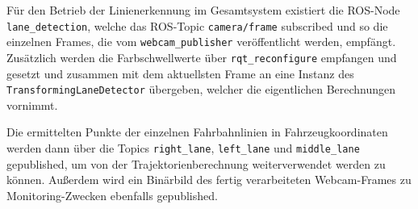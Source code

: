 F\"ur den Betrieb der Linienerkennung im Gesamtsystem existiert die ROS-Node \texttt{lane\_detection},
welche das ROS-Topic \texttt{camera/frame} subscribed und so die einzelnen Frames, die vom
\texttt{webcam\_publisher} ver\"offentlicht werden, empf\"angt. Zus\"atzlich werden die Farbschwellwerte
\"uber \texttt{rqt\_reconfigure}\cite{reconfigure} empfangen und gesetzt und zusammen mit
dem aktuellsten Frame an eine Instanz des \texttt{TransformingLaneDetector} \"ubergeben, welcher die
eigentlichen Berechnungen vornimmt.

Die ermittelten Punkte der einzelnen Fahrbahnlinien in Fahrzeugkoordinaten werden dann \"uber die Topics
\texttt{right\_lane}, \texttt{left\_lane} und \texttt{middle\_lane} gepublished, um von der
Trajektorienberechnung weiterverwendet werden zu k\"onnen. Au\ss erdem wird ein Bin\"arbild des fertig
verarbeiteten Webcam-Frames zu Monitoring-Zwecken ebenfalls gepublished.
